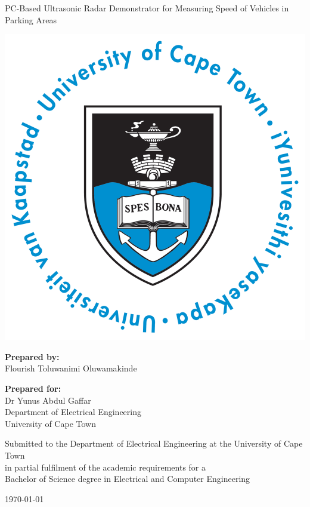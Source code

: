\begin{center}
    
\Huge

\vspace{5cm}

PC-Based Ultrasonic Radar Demonstrator for Measuring Speed of Vehicles in Parking Areas

\vspace{2cm}

\includegraphics[width=0.4\linewidth]{FrontMatter/UCT_logo.png}

\vfill

\large
\textbf{Prepared by:}\\
Flourish Toluwanimi Oluwamakinde

\vspace{1cm}

\textbf{Prepared for:}\\
Dr Yunus Abdul Gaffar\\
Department of Electrical Engineering\\
University of Cape Town

\vspace{2cm}

\small
Submitted to the Department of Electrical Engineering at the University of Cape Town\\
in partial fulfilment of the academic requirements for a\\
Bachelor of Science degree in Electrical and Computer Engineering

\vspace{2cm}

\today


\end{center}